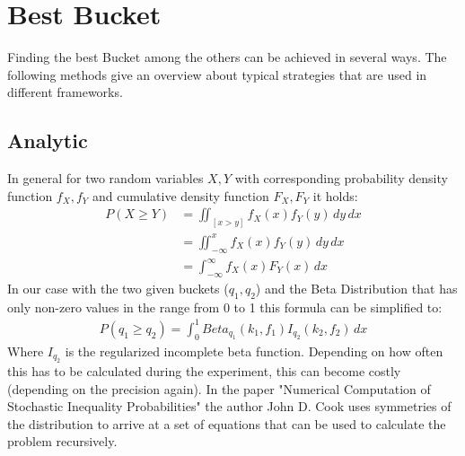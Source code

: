 \documentclass[../Thesis.tex]{subfiles}
\begin{document}
\section{Best Bucket}
Finding the best Bucket among the others can be achieved in several ways. The following methods give an overview about typical strategies that are used in different frameworks.
\subsection{Analytic}
In general for two random variables $X,Y$ with corresponding probability density function $f_X,f_Y$ and cumulative density function $F_X,F_Y$ it holds: 
\begin{align*}
P(X \geq Y ) &= \iint_{[x>y]} f_X(x)f_Y(y) \,dy\,dx \\
			 &= \iint_{-\infty}^{x} f_X(x)f_Y(y) \,dy\,dx \\
			 &= \int_{-\infty}^{\infty}f_X(x)F_Y(x)\,dx
\end{align*}
In our case with the two given buckets ($q_1,q_2$) and the Beta Distribution that has only non-zero values in the range from 0 to 1 this formula can be simplified to:
\begin{align*}
P(q_1 \geq q_2 ) = \int_{0}^{1}Beta_{q_1}(k_1,f_1)I_{q_2}(k_2,f_2)\,dx
\end{align*}
Where $I_{q_2}$ is the regularized incomplete beta function. Depending on how often this has to be calculated during the experiment, this can become costly (depending on the precision again). In the paper "Numerical Computation of Stochastic Inequality Probabilities" the author John D. Cook \cite{cook2008numerical} uses symmetries of the distribution to arrive at a set of equations that can be used to calculate the problem recursively.
\end{document}
